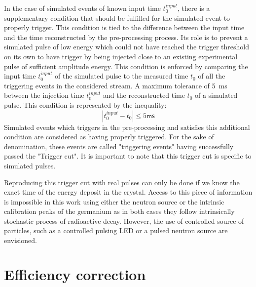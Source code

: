 In the case of simulated events of known input time $t_0^{input}$, there is a supplementary condition that should be fulfilled for the simulated event to properly trigger. This condition is tied to the difference between the input time and the time reconstructed by the pre-processing process. Its role is to prevent a simulated pulse of low energy which could not have reached the trigger threshold on its own to have trigger by being injected close to an existing experimental pulse of sufficient amplitude energy. This condition is enforced by comparing the input time $t_0^{input}$ of the simulated pulse to the measured time $t_0$ of all the triggering events in the considered stream. A maximum tolerance of \SI{5}{\milli\s} between the injection time  $t_0^{input}$ and the reconstructed time $t_0$ of a simulated pulse. This condition is represented by the inequality:
\begin{equation}
| t_0^{input} - t_0 | \leq 5\textsf{ms}
\end{equation}
Simulated events which triggers in the pre-processing and satisfies this additional condition  are considered as having properly triggered. For the sake of denomination, these events are called "triggering events" having successfully passed the "Trigger cut". 
It is important to note that this trigger cut is specific to simulated pulses.

Reproducing this trigger cut with real pulses can only be done if we know the exact time of the energy deposit in the crystal. Access to this piece of information is impossible in this work using either the neutron source or the intrinsic calibration peaks of the germanium as in both cases they follow intrinsically stochastic process of radioactive decay. However, the use of controlled source of particles, such as a controlled pulsing LED or a pulsed neutron source are envisioned.



\section{Efficiency correction}
\label{par:efficiency}


